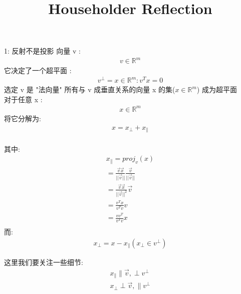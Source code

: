 \documentclass[12pt]{article}
\title{Householder Reflection}
\date{}
\begin{document}
\maketitle


\begin{flushleft}
    1: 反射不是投影
    向量 v : \\
    \begin{align}
        v  \in  \mathbb{R}^{m}
    \end{align}
    它决定了一个超平面 :\\
    \begin{align}
        v^{\perp} = {x \in \mathbb{R}^{m} : v^{T}x = 0 }
    \end{align}
    选定 v 是 "法向量" 所有与 v 成垂直关系的向量 x 的集($x \in \mathbb{R}^{m}$) 成为超平面 \\
    对于任意 x :\\
    \begin{align}
        x \in \mathbb{R}^{m}
    \end{align}
    将它分解为: \\
    \begin{align}
        x  = x_{\perp} + x_{\parallel}
    \end{align} \\
    其中: \\
    \begin{align}
        x_{\parallel} = proj_{v}(x)                                      \\
        = \frac{\vec{v}\vec{x}}{||\vec{v}||} \frac{\vec{v}}{||\vec{v}||} \\
        = \frac{\vec{v}\vec{x}}{||\vec{v}||^{2}} \vec{v}                 \\
        = \frac{v^{T}x}{v^{T}v} v                                        \\
        = \frac{vv^{T}}{v^{T}v} x                                        \\
    \end{align}
    而: \\
    \begin{align}
        x_{\perp} = x  - x_{\parallel} (x_{\perp} \in v^{\perp})
    \end{align}

    这里我们要关注一些细节: \\
    \begin{align}
        x_{\parallel} \parallel \vec{v}, \perp  v^{\perp} \\
        x_{\perp} \perp \vec{v}, \parallel v^{\perp}
    \end{align}


\end{flushleft}
\end{document}
